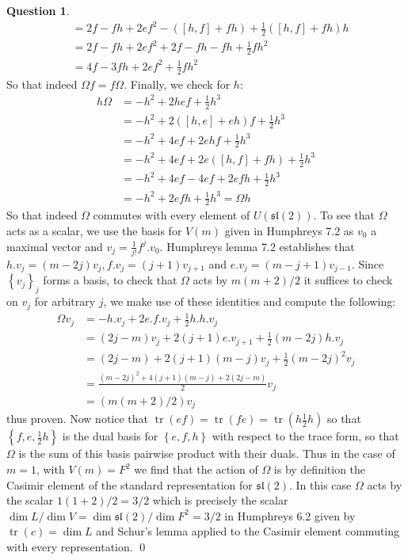 \documentclass[10.5pt]{article}
\theoremstyle{definition}
\newtheorem{pb}{Question}
\numberwithin{example}{subsection}
\numberwithin{proposition}{subsection}
\newcommand{\set}[1]{\left\{#1\right\}}
\begin{document}
\begin{pb}
\begin{align}
            &= 2f - fh + 2ef^2 - ([h,f] + fh) + \frac12([h,f] + fh)h \\
            &= 2f - fh + 2ef^2 + 2f - fh -fh + \frac12 fh^2 \\
            &= 4f - 3fh + 2ef^2 + \frac12 fh^2
        \end{align}
        So that indeed \(\Omega f = f\Omega\). Finally, we check for \(h\):
        \begin{align}
            h\Omega &= -h^2 + 2hef + \frac12h^3 \\
            &= -h^2 + 2([h,e] + eh)f + \frac12 h^3 \\
            &= -h^2 + 4ef + 2ehf + \frac12 h^3 \\
            &= -h^2 + 4ef + 2e([h,f] + fh) + \frac12 h^3 \\
            &= -h^2 + 4ef -4ef + 2efh + \frac12 h^3 \\
            &= -h^2 + 2efh + \frac12h^3 = \Omega h
        \end{align}
        So that indeed \(\Omega\) commutes with every element of \(U(\mathfrak{sl}(2))\). To see that \(\Omega\) acts as a scalar, we use the basis for \(V(m)\) given in Humphreys 7.2 as \(v_0\) a maximal vector and \(v_j = \frac{1}{j!}f^j.v_0\). Humphreys lemma 7.2 establishes that \(h.v_j = (m-2j)v_j, f.v_j = (j+1)v_{j+1}\) and \(e.v_j = (m - j + 1)v_{j-1}\). Since \(\set{v_j}_j\) forms a basis, to check that \(\Omega\) acts by \(m(m+2)/2\) it suffices to check on \(v_j\) for arbitrary \(j\), we make use of these identities and compute the following:
        \begin{align}
            \Omega v_j &= -h.v_j + 2e.f.v_j + \frac12 h.h.v_j \\
            &= (2j-m)v_j + 2(j+1)e.v_{j+1} + \frac12(m-2j)h.v_j  \\
            &= (2j-m) + 2(j+1)(m-j)v_j + \frac12(m-2j)^2 v_j \\
            &= \frac{(m-2j)^2 + 4(j+1)(m-j) + 2(2j-m)}{2} v_j \\
            &= (m(m+2)/2) v_j
        \end{align}
        thus proven. Now notice that \(\operatorname{tr}(ef) = \operatorname{tr}(fe) = \operatorname{tr}(h\frac12 h)\) so that \(\set{f,e,\frac12 h}\) is the dual basis for \(\set{e,f,h}\) with respect to the trace form, so that \(\Omega\) is the sum of this basis pairwise product with their duals. Thus in the case of \(m = 1\), with \(V(m) = F^2\) we find that the action of \(\Omega\) is by definition the Casimir element of the standard representation for \(\mathfrak{sl}(2)\). In this case \(\Omega\) acts by the scalar \(1(1+2)/2 = 3/2\) which is precisely the scalar \(\dim L/\dim V = \dim \mathfrak{sl}(2)/\dim F^2 = 3/2\) in Humphreys 6.2 given by \(\operatorname{tr}(c)= \dim L\) and Schur's lemma applied to the Casimir element commuting with every representation. \qed


\end{pb}
\end{document}
